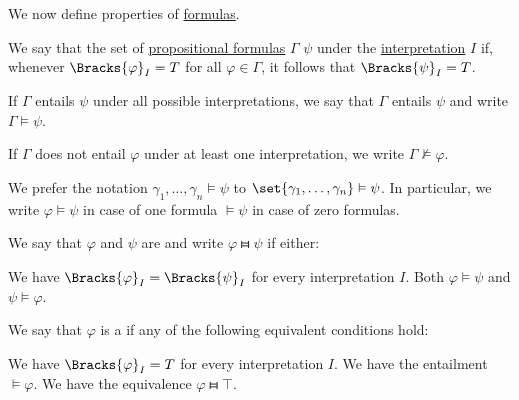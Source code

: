 \begin{definition}\label{def:propositional_semantics}\mimprovised
  We now define  properties of \hyperref[def:propositional_syntax/formula]{formulas}.

  \begin{thmenum}
     We say that the set of \hyperref[def:propositional_syntax/formula]{propositional formulas} \( \Gamma \)  \( \psi \) under the \hyperref[def:propositional_valuation/interpretation]{interpretation} \( I \) if, whenever \( \Bracks{\varphi}_I = T \) for all \( \varphi \in \Gamma \), it follows that \( \Bracks{\psi}_I = T \).

     If \( \Gamma \) entails \( \psi \) under all possible interpretations, we say that \( \Gamma \) entails \( \psi \) and write \( \Gamma \vDash \psi \).

    If \( \Gamma \) does not entail \( \varphi \) under at least one interpretation, we write \( \Gamma \not\vDash \varphi \).

    We prefer the notation \( \gamma_1, \ldots, \gamma_n \vDash \psi \) to \( \set{ \gamma_1, \ldots, \gamma_n } \vDash \psi \). In particular, we write \( \varphi \vDash \psi \) in case of one formula \( \vDash \psi \) in case of zero formulas.

     We say that \( \varphi \) and \( \psi \) are  and write \( \varphi \gleichstark \psi \) if either:
    \begin{thmenum}
       We have \( \Bracks{\varphi}_I = \Bracks{\psi}_I \) for every interpretation \( I \).
       Both \( \varphi \vDash \psi \) and \( \psi \vDash \varphi \).
    \end{thmenum}

     We say that \( \varphi \) is a  if any of the following equivalent conditions hold:
    \begin{thmenum}
       We have \( \Bracks{\varphi}_I = T \) for every interpretation \( I \).
       We have the entailment \( \vDash \varphi \).
       We have the equivalence \( \varphi \gleichstark \top \).
    \end{thmenum}


\end{thmenum}
\end{definition}
